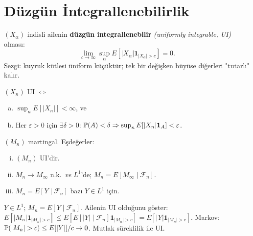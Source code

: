 \section{Düzgün İntegrallenebilirlik}
\label{sec:duzgun_integral}

\begin{tanim}
\label{def:duzgun_integral}
$(X_\alpha)$ indisli ailenin \textbf{düzgün integrallenebilir} \emph{(uniformly integrable, UI)} olması:
\[
  \lim_{c\to\infty}\sup_\alpha E[|X_\alpha|\mathbf{1}_{|X_\alpha|>c}] = 0.
\]
Sezgi: kuyruk kütlesi üniform küçüktür; tek bir değişken büyüse diğerleri "tutarlı" kalır.
\end{tanim}

\begin{teorem}[UI Karakterizasyon]
\label{thm:ui_karakt}
$(X_n)$ UI $\iff$
\begin{enumerate}[(a)]
  \item $\sup_n E[|X_n|]<\infty$, ve
  \item Her $\varepsilon>0$ için $\exists\delta>0$: $\mathbb{P}(A)<\delta\Rightarrow\sup_n E[|X_n|\mathbf{1}_A]<\varepsilon$.
\end{enumerate}
\end{teorem}

\begin{teorem}
\label{thm:ui_mart_yakinsama}
$(M_n)$ martingal. Eşdeğerler:
\begin{enumerate}[(i)]
  \item $(M_n)$ UI'dir.
  \item $M_n\to M_\infty$ n.k.\ \emph{ve} $L^1$'de; $M_n = E[M_\infty\mid\mathcal{F}_n]$.
  \item $M_n = E[Y\mid\mathcal{F}_n]$ bazı $Y\in L^1$ için.
\end{enumerate}
\end{teorem}

\begin{ornek}
$Y\in L^1$; $M_n = E[Y\mid\mathcal{F}_n]$. Ailenin UI olduğunu göster:
$E[|M_n|\mathbf{1}_{|M_n|>c}] \leq E[E[|Y|\mid\mathcal{F}_n]\mathbf{1}_{|M_n|>c}] = E[|Y|\mathbf{1}_{|M_n|>c}]$.
Markov: $\Prob(|M_n|>c)\leq E[|Y|]/c\to0$. Mutlak süreklilik ile UI.
\end{ornek}


